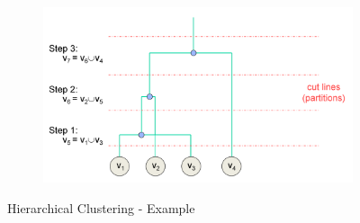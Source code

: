 \begin{figure}[h]
\begin{center}
		\hfill
		\begin{subfigure}[b]{0.45\textwidth}
			\includegraphics[width=\textwidth]{images/Hierarchical_clustering_4.png}	
		\end{subfigure}
	\end{center}
	\caption{Hierarchical Clustering - Example}
	\label{fig:hierarchical_clustering}
\end{figure}









